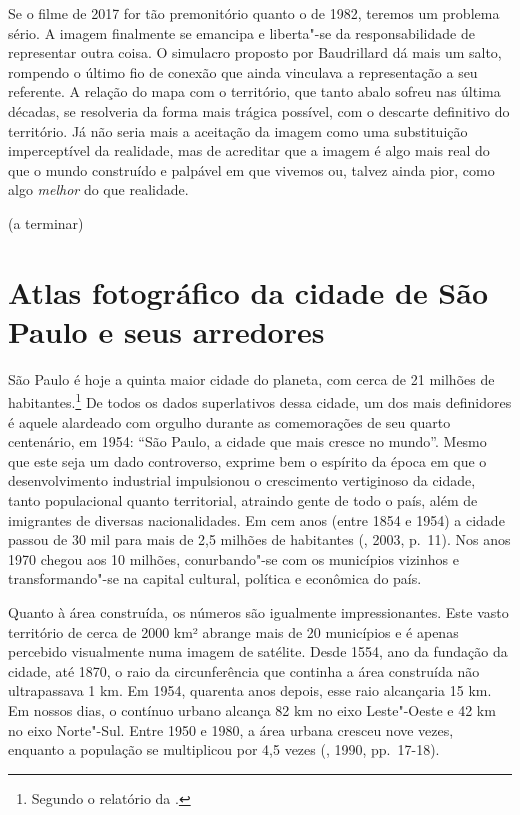 Se o filme de 2017 for tão premonitório quanto o de 1982, teremos um
problema sério. A imagem finalmente se emancipa e liberta"-se da
responsabilidade de representar outra coisa. O simulacro proposto por
Baudrillard dá mais um salto, rompendo o último fio de conexão que ainda
vinculava a representação a seu referente. A relação do mapa com o
território, que tanto abalo sofreu nas última décadas, se resolveria da
forma mais trágica possível, com o descarte definitivo do território. Já
não seria mais a aceitação da imagem como uma substituição imperceptível
da realidade, mas de acreditar que a imagem é algo mais real do que o
mundo construído e palpável em que vivemos ou, talvez ainda pior, como
algo \emph{melhor} do que realidade.

(a terminar)

\chapter*{Atlas fotográfico da cidade de São Paulo e seus arredores}

São Paulo é hoje a quinta maior cidade do planeta, com cerca de 21
milhões de habitantes.\footnote{Segundo o relatório da  {}.} De todos os dados superlativos dessa cidade,
um dos mais definidores é aquele alardeado com orgulho durante as
comemorações de seu quarto centenário, em 1954: ``São Paulo, a cidade
que mais cresce no mundo''. Mesmo que este seja um dado controverso,
exprime bem o espírito da época em que o desenvolvimento industrial
impulsionou o crescimento vertiginoso da cidade, tanto populacional
quanto territorial, atraindo gente de todo o país, além de imigrantes de
diversas nacionalidades. Em cem anos (entre 1854 e 1954) a cidade passou
de 30 mil para mais de 2,5 milhões de habitantes (, 2003, p.~11).
Nos anos 1970 chegou aos 10 milhões, conurbando"-se com os municípios
vizinhos e transformando"-se na capital cultural, política e econômica do
país.

Quanto à área construída, os números são igualmente impressionantes.
Este vasto território de cerca de 2000 km² abrange mais de 20 municípios
e é apenas percebido visualmente numa imagem de satélite. Desde 1554,
ano da fundação da cidade, até 1870, o raio da circunferência que
continha a área construída não ultrapassava 1 km. Em 1954, quarenta anos
depois, esse raio alcançaria 15 km. Em nossos dias, o contínuo urbano
alcança 82 km no eixo Leste"-Oeste e 42 km no eixo Norte"-Sul. Entre 1950
e 1980, a área urbana cresceu nove vezes, enquanto a população se
multiplicou por 4,5 vezes (, 1990, pp.~17-18).

